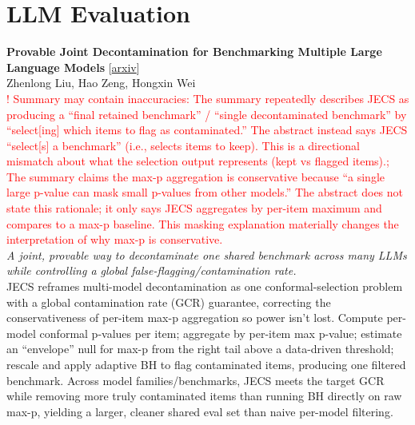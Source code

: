 \documentclass[12pt,letterpaper]{article}
\begin{document}
\medskip


\section*{LLM Evaluation}

{\small\textbf{Provable Joint Decontamination for Benchmarking Multiple Large Language Models}} {\scriptsize[\href{https://arxiv.org/abs/2605.21543}{arxiv}]}\\
{\scriptsize Zhenlong Liu, Hao Zeng, Hongxin Wei}\\

{\scriptsize\textcolor{red}{! Summary may contain inaccuracies: The summary repeatedly describes JECS as producing a ``final retained benchmark'' / ``single decontaminated benchmark'' by ``select[ing] which items to flag as contaminated.'' The abstract instead says JECS ``select[s] a benchmark'' (i.e., selects items to keep). This is a directional mismatch about what the selection output represents (kept vs flagged items).; The summary claims the max-p aggregation is conservative because ``a single large p-value can mask small p-values from other models.'' The abstract does not state this rationale; it only says JECS aggregates by per-item maximum and compares to a max-p baseline. This masking explanation materially changes the interpretation of why max-p is conservative.}}\\[1pt]

{\small\textit{A joint, provable way to decontaminate one shared benchmark across many LLMs while controlling a global false-flagging/contamination rate.}}\\[1pt]
{\footnotesize JECS reframes multi-model decontamination as one conformal-selection problem with a global contamination rate (GCR) guarantee, correcting the conservativeness of per-item max-p aggregation so power isn't lost. Compute per-model conformal p-values per item; aggregate by per-item max p-value; estimate an ``envelope'' null for max-p from the right tail above a data-driven threshold; rescale and apply adaptive BH to flag contaminated items, producing one filtered benchmark. Across model families/benchmarks, JECS meets the target GCR while removing more truly contaminated items than running BH directly on raw max-p, yielding a larger, cleaner shared eval set than naive per-model filtering.}

\medskip
\end{document}
